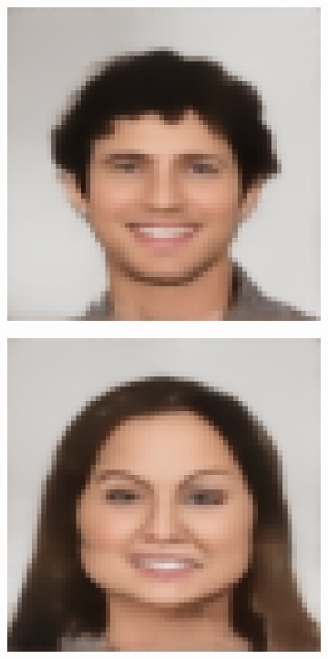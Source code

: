 \documentclass{IEEEcsmag}
\begin{document}
\begin{figure}[ht]
\begin{subfigure}{0.12\textwidth}
    \end{subfigure}
    \begin{subfigure}{0.12\textwidth}
        \includegraphics[width=\linewidth]{images/CelebA/1/proposed_ae_5.png}
    \end{subfigure}
    \begin{subfigure}{0.12\textwidth}
        \includegraphics[width=\linewidth]{CUHK_Student/generated_images/f1-001-01-sz1.jpg_AE_UNET.png}

\end{subfigure}
\end{figure}
\end{document}
